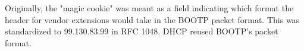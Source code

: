 Originally, the "magic cookie" was meant as a field indicating which format the header for vendor extensions would take in the BOOTP packet format. This was standardized to 99.130.83.99 in RFC 1048. DHCP reused BOOTP's packet format.